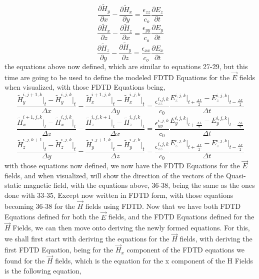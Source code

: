 \documentclass[]{article}
\begin{document}
\begin{equation}
\frac{\partial{\tilde{H}}_y}{\partial{x}} - \frac{\partial{\tilde{{H}}}_x}{\partial{y}} = \frac{\epsilon_{zz}}{c_{o}} \frac{\partial{E}_z}{\partial{t}}
\end{equation}
\begin{equation}
\frac{\partial{\tilde{H}}_x}{\partial{z}} - \frac{\partial{\tilde{{H}}}_z}{\partial{x}} = \frac{\epsilon_{yy}}{c_{o}} \frac{\partial{E}_y}{\partial{t}}
\end{equation}
\begin{equation}
\frac{\partial{\tilde{H}}_z}{\partial{y}} - \frac{\partial{\tilde{{H}}}_y}{\partial{z}} = \frac{\epsilon_{xx}}{c_{o}} \frac{\partial{E}_x}{\partial{t}}
\end{equation}
the equations above now defined, which are similar to equations 27-29, but this time are going to be used to define the modeled FDTD Equations for the $\vec{E}$ fields when visualized, with those FDTD Equations being,
\begin{equation}
\frac{\tilde{H}_{y}^{i, j + 1 , k} \Big|_t - \tilde{H}_{y}^{i,j,k}\Big|_t}{\Delta{x}} - \frac{\tilde{H}_{x}^{i + 1, j, k} \Big|_t - \tilde{H}_{x}^{i,j,k}\Big|_t}{\Delta{y}} = \frac{\epsilon_{zz}^{i,j,k}}{c_0} \frac{{E}_{z}^{i,j,k}\Big|_{t+\frac{\Delta{L}}{2}} -E_{z}^{i,j,k}\Big|_{t - \frac{\Delta{L}}{2}}}{\Delta{t}}
\end{equation}
\begin{equation}
\frac{\tilde{H}_{x}^{i+1, j , k} \Big|_t - \tilde{H}_{x}^{i,j,k}\Big|_t}{\Delta{z}} - \frac{\tilde{H}_{z}^{i, j, k + 1} \Big|_t - \tilde{H}_{z}^{i,j,k}\Big|_t}{\Delta{x}} = \frac{\epsilon_{yy}^{i,j,k}}{c_0} \frac{{E}_{y}^{i,j,k}\Big|_{t+\frac{\Delta{L}}{2}} -E_{y}^{i,j,k}\Big|_{t - \frac{\Delta{L}}{2}}}{\Delta{t}}
\end{equation}
\begin{equation}
\frac{\tilde{H}_{z}^{i,j,k+1} \Big|_t - \tilde{H}_{z}^{i,j,k}\Big|_t}{\Delta{y}} - \frac{\tilde{H}_{y}^{i, j + 1, k} \Big|_t - \tilde{H}_{y}^{i,j,k}\Big|_t}{\Delta{z}} = \frac{\epsilon_{zz}^{i,j,k}}{c_0} \frac{{E}_{z}^{i,j,k}\Big|_{t+\frac{\Delta{L}}{2}} -E_{z}^{i,j,k}\Big|_{t - \frac{\Delta{L}}{2}}}{\Delta{t}}
\end{equation}
with those equations now defined, we now have the FDTD Equations for the $\vec{E}$ fields, and when visualized, will show the direction of the vectors of the Quasi-static magnetic field, with the equations above, 36-38, being the same as the ones done with 33-35, Except now written in FDTD form, with those equations becoming 36-38 for the $\vec{H}$ fields using FDTD. Now that we have both FDTD Equations defined for both the $\vec{E}$ fields, and the FDTD Equations defined for the $\vec{H}$ Fields, we can then move onto deriving the newly formed equations. For this, we shall first start with deriving the equations for the $\vec{H}$ fields, with deriving the first FDTD Equation, being for the $\vec{H}_x$ component of the FDTD equations we found for the $\vec{H}$ fields, which is the equation for the x component of the H Fields is the following equation, 
\end{document}
